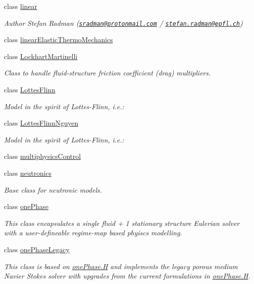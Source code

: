 \begin{DoxyCompactItemize}
class \hyperlink{classFoam_1_1linear}{linear}
\begin{DoxyCompactList}\small\item\em Author Stefan Radman (\href{mailto:sradman@protonmail.com}{\tt sradman@protonmail.\+com} / \href{mailto:stefan.radman@epfl.ch}{\tt stefan.\+radman@epfl.\+ch}) \end{DoxyCompactList}\item 
class \hyperlink{classFoam_1_1linearElasticThermoMechanics}{linear\+Elastic\+Thermo\+Mechanics}
\item 
class \hyperlink{classFoam_1_1LockhartMartinelli}{Lockhart\+Martinelli}
\begin{DoxyCompactList}\small\item\em Class to handle fluid-\/structure friction coefficient (drag) multipliers. \end{DoxyCompactList}\item 
class \hyperlink{classFoam_1_1LottesFlinn}{Lottes\+Flinn}
\begin{DoxyCompactList}\small\item\em Model in the spirit of Lottes-\/\+Flinn, i.\+e.\+: \end{DoxyCompactList}\item 
class \hyperlink{classFoam_1_1LottesFlinnNguyen}{Lottes\+Flinn\+Nguyen}
\begin{DoxyCompactList}\small\item\em Model in the spirit of Lottes-\/\+Flinn, i.\+e.\+: \end{DoxyCompactList}\item 
class \hyperlink{classFoam_1_1multiphysicsControl}{multiphysics\+Control}
\item 
class \hyperlink{classFoam_1_1neutronics}{neutronics}
\begin{DoxyCompactList}\small\item\em Base class for neutronic models. \end{DoxyCompactList}\item 
class \hyperlink{classFoam_1_1onePhase}{one\+Phase}
\begin{DoxyCompactList}\small\item\em This class encapsulates a single fluid + 1 stationary structure Eulerian solver with a user-\/defineable regime-\/map based phyiscs modelling. \end{DoxyCompactList}\item 
class \hyperlink{classFoam_1_1onePhaseLegacy}{one\+Phase\+Legacy}
\begin{DoxyCompactList}\small\item\em This class is based on \hyperlink{onePhase_8H}{one\+Phase.\+H} and implements the legacy porous medium Navier Stokes solver with upgrades from the current formulations in \hyperlink{onePhase_8H}{one\+Phase.\+H}. \end{DoxyCompactList}\item 

\end{DoxyCompactItemize}
